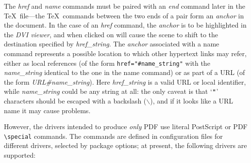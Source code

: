\documentclass[pdftex]{article}
\begin{document}
The \emph{href} and \emph{name} commands must be paired with an
\emph{end} command later in the \TeX\ file---the \TeX\ commands between
the two ends of a pair form an \emph{anchor} in the document. In the
case of an \emph{href} command, the \emph{anchor} is to be highlighted
in the \emph{DVI viewer}, and when clicked on will cause the scene to
shift to the destination specified by \emph{href\_string}. The
\emph{anchor} associated with a name command represents a possible
location to which other hypertext links may refer, either as local
references (of the form \verb|href="#name_string"| with the
\emph{name\_string} identical to the one in the name command) or as part
of a URL (of the form \emph{URL\#name\_string}). Here
\emph{href\_string} is a valid URL or local identifier, while
\emph{name\_string} could be any string at all: the only caveat is that
`$\verb|"|$' characters should be escaped with a backslash
($\backslash$), and if it looks like a URL name it may cause problems.

However, the drivers intended to produce \emph{only} PDF use literal
PostScript or PDF \verb|\special| commands. The commands are defined in
configuration files for different drivers, selected by package options;
at present, the following drivers are supported:
\end{document}

